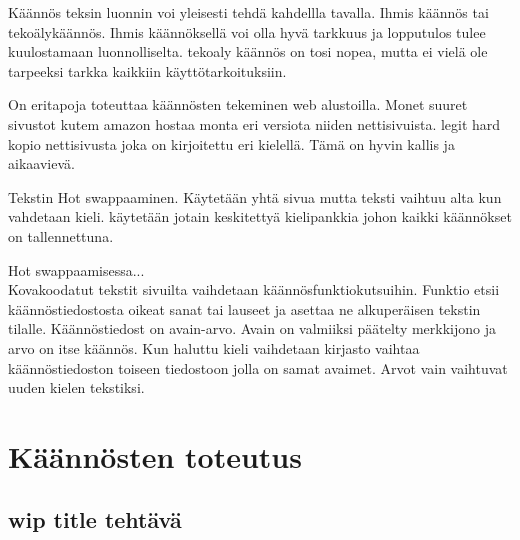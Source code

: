 \documentclass[11pt,a4paper,titlepage,oneside]{article}
\begin{document}
Käännös teksin luonnin voi yleisesti tehdä kahdellla tavalla. Ihmis käännös tai tekoälykäännös.
Ihmis käännöksellä voi olla hyvä tarkkuus ja lopputulos tulee kuulostamaan luonnolliselta.
tekoaly käännös on tosi nopea, mutta ei vielä ole tarpeeksi tarkka kaikkiin käyttötarkoituksiin.
\medskip






On eritapoja toteuttaa käännösten tekeminen web alustoilla. Monet suuret sivustot kutem amazon \citemissing{} 
hostaa monta eri versiota niiden nettisivuista.
legit hard kopio nettisivusta joka on kirjoitettu eri kielellä. Tämä on hyvin kallis ja aikaavievä.

Tekstin Hot swappaaminen. Käytetään yhtä sivua mutta teksti vaihtuu alta kun vahdetaan kieli. \citemissing{}
käytetään jotain keskitettyä kielipankkia johon kaikki käännökset on tallennettuna.
\medskip


Hot swappaamisessa...\\
Kovakoodatut tekstit sivuilta vaihdetaan käännösfunktiokutsuihin.
Funktio etsii käännöstiedostosta oikeat sanat tai lauseet ja asettaa ne alkuperäisen tekstin tilalle. 
Käännöstiedost on avain-arvo. %
Avain on valmiiksi päätelty merkkijono ja arvo on itse käännös. 
Kun haluttu kieli vaihdetaan kirjasto vaihtaa käännöstiedoston toiseen tiedostoon jolla on samat avaimet. 
Arvot vain vaihtuvat uuden kielen tekstiksi.\citemissing
\medskip












\newpage






\section{Käännösten toteutus}

\subsection{wip title tehtävä}
\end{document}
